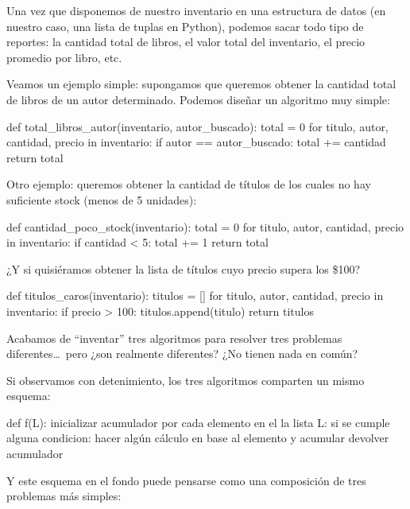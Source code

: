 \begin{subappendices}
Una vez que disponemos de nuestro inventario en una estructura de datos (en
nuestro caso, una lista de tuplas en Python), podemos sacar todo tipo de
reportes: la cantidad total de libros, el valor total del
inventario, el precio promedio por libro, etc.

Veamos un ejemplo simple: supongamos que queremos obtener la cantidad total de
libros de un autor determinado. Podemos diseñar un algoritmo muy simple:

\begin{codigo-python-sn}
def total_libros_autor(inventario, autor_buscado):
    total = 0
    for titulo, autor, cantidad, precio in inventario:
        if autor == autor_buscado:
            total += cantidad
    return total
\end{codigo-python-sn}

Otro ejemplo: queremos obtener la cantidad de títulos de los cuales no hay
suficiente stock (menos de 5 unidades):

\begin{codigo-python-sn}
def cantidad_poco_stock(inventario):
    total = 0
    for titulo, autor, cantidad, precio in inventario:
        if cantidad < 5:
            total += 1
    return total
\end{codigo-python-sn}

¿Y si quisiéramos obtener la lista de títulos cuyo precio supera los \$100?

\begin{codigo-python-sn}
def titulos_caros(inventario):
    titulos = []
    for titulo, autor, cantidad, precio in inventario:
        if precio > 100:
            titulos.append(titulo)
    return titulos
\end{codigo-python-sn}

Acabamos de ``inventar'' tres algoritmos para resolver tres problemas
diferentes\ldots\ pero ¿son realmente diferentes? ¿No tienen nada en común?

Si observamos con detenimiento, los tres algoritmos comparten un mismo esquema:

\begin{codigo-nohl-sn}
def f(L):
    inicializar acumulador
    por cada elemento en el la lista L:
        si se cumple alguna condicion:
            hacer algún cálculo en base al elemento y acumular
    devolver acumulador
\end{codigo-nohl-sn}

Y este esquema en el fondo puede pensarse como una composición de tres
problemas más simples:


\end{subappendices}

